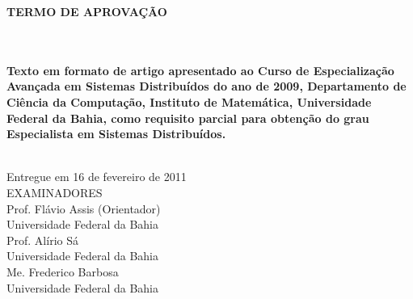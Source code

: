 

\begin{titlepage}
 \vfill
 \begin{center}
   {\large \uppercase{ \bf{ TERMO DE APROVAÇÃO } } } \\[2.5cm]
   {\large \uppercase{ \bf{ \meunome\ } } } \\[3cm]
   {\Large \uppercase{ \bf{ \meutitulo\ } } }\\[3cm]
   \hspace{.45\textwidth} %
   \begin{minipage}{.5\textwidth}
       \bf{
	Texto em formato de artigo apresentado ao Curso de Especialização Avançada em Sistemas Distribuídos do ano de 2009, Departamento de Ciência da Computação, 
	Instituto de Matemática, Universidade Federal da Bahia, como requisito parcial para obtenção do grau Especialista em Sistemas Distribuídos. \\ 
       }      
   \end{minipage}
   \\[0.8cm]
   Entregue em 16 de fevereiro de 2011 \\[1.2cm]
   EXAMINADORES \\[1cm]
   Prof. Flávio Assis (Orientador) \\[-0.15cm]
   Universidade Federal da Bahia \\[0.3cm]
   Prof. Alírio Sá \\[-0.15cm]
   Universidade Federal da Bahia \\[0.3cm]
   Me. Frederico Barbosa \\[-0.15cm]
   Universidade Federal da Bahia \\[0.3cm]
   \vfill
 \end{center}
\end{titlepage}
